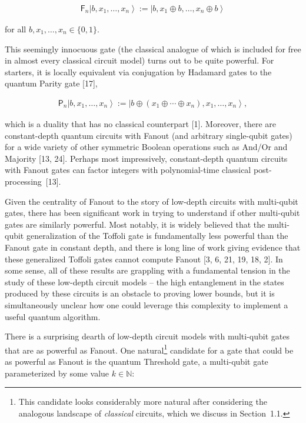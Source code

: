 \documentclass[10pt,a4paper]{article}
\begin{document}
\[\begin{gathered}
\mathsf{F}_{n}\left|b,x_{1},\ldots,x_{n}\right\rangle:=\left|b,x_{1}\oplus b,\ldots,x_{n}\oplus b\right\rangle
\end{gathered}\]


for all $b,x_{1},\ldots,x_{n}\in\{0,1\}$.\par




This seemingly innocuous gate (the classical analogue of which is included for free in almost every classical circuit model) turns out to be quite powerful. For starters, it is locally equivalent via conjugation by Hadamard gates to the quantum Parity gate [17],\par


\[\begin{gathered}
\mathsf{P}_{n}\left|b,x_{1},\ldots,x_{n}\right\rangle:=\left|b\oplus(x_{1}\oplus\cdots\oplus x_{n}),x_{1},\ldots,x_{n}\right\rangle,
\end{gathered}\]


which is a duality that has no classical counterpart [1]. Moreover, there are constant-depth quantum circuits with Fanout (and arbitrary single-qubit gates) for a wide variety of other symmetric Boolean operations such as And/Or and Majority [13, 24]. Perhaps most impressively, constant-depth quantum circuits with Fanout gates can factor integers with polynomial-time classical post-processing [13].\par




Given the centrality of Fanout to the story of low-depth circuits with multi-qubit gates, there has been significant work in trying to understand if other multi-qubit gates are similarly powerful. Most notably, it is widely believed that the multi-qubit generalization of the Toffoli gate is fundamentally less powerful than the Fanout gate in constant depth, and there is long line of work giving evidence that these generalized Toffoli gates cannot compute Fanout [3, 6, 21, 19, 18, 2]. In some sense, all of these results are grappling with a fundamental tension in the study of these low-depth circuit models – the high entanglement in the states produced by these circuits is an obstacle to proving lower bounds, but it is simultaneously unclear how one could leverage this complexity to implement a useful quantum algorithm.\par




There is a surprising dearth of low-depth circuit models with multi-qubit gates that are as powerful as Fanout. One natural\footnote{This candidate looks considerably more natural after considering the analogous landscape of \emph{classical} circuits, which we discuss in Section 1.1.} candidate for a gate that could be as powerful as Fanout is the quantum Threshold gate, a multi-qubit gate parameterized by some value $k\in\mathbb{N}$:\par
\end{document}
